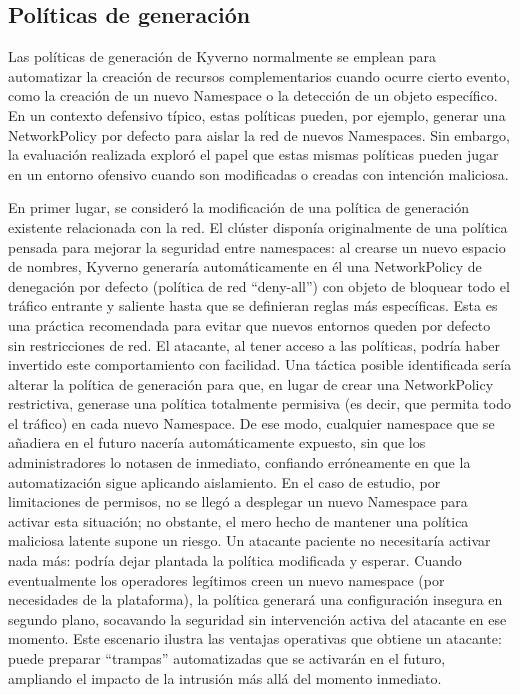\documentclass[12pt,twoside,titlepage]{report}
\begin{document}
\subsection{Políticas de generación}
Las políticas de generación de Kyverno normalmente se emplean para automatizar la creación de recursos complementarios cuando ocurre cierto evento, como la creación de un nuevo Namespace o la detección de un objeto específico. En un contexto defensivo típico, estas políticas pueden, por ejemplo, generar una NetworkPolicy por defecto para aislar la red de nuevos Namespaces. Sin embargo, la evaluación realizada exploró el papel que estas mismas políticas pueden jugar en un entorno ofensivo cuando son modificadas o creadas con intención maliciosa. 

En primer lugar, se consideró la modificación de una política de generación existente relacionada con la red. El clúster disponía originalmente de una política pensada para mejorar la seguridad entre namespaces: al crearse un nuevo espacio de nombres, Kyverno generaría automáticamente en él una NetworkPolicy de denegación por defecto (política de red “deny-all”) con objeto de bloquear todo el tráfico entrante y saliente hasta que se definieran reglas más específicas. Esta es una práctica recomendada para evitar que nuevos entornos queden por defecto sin restricciones de red. El atacante, al tener acceso a las políticas, podría haber invertido este comportamiento con facilidad. Una táctica posible identificada sería alterar la política de generación para que, en lugar de crear una NetworkPolicy restrictiva, generase una política totalmente permisiva (es decir, que permita todo el tráfico) en cada nuevo Namespace. De ese modo, cualquier namespace que se añadiera en el futuro nacería automáticamente expuesto, sin que los administradores lo notasen de inmediato, confiando erróneamente en que la automatización sigue aplicando aislamiento. En el caso de estudio, por limitaciones de permisos, no se llegó a desplegar un nuevo Namespace para activar esta situación; no obstante, el mero hecho de mantener una política maliciosa latente supone un riesgo. Un atacante paciente no necesitaría activar nada más: podría dejar plantada la política modificada y esperar. Cuando eventualmente los operadores legítimos creen un nuevo namespace (por necesidades de la plataforma), la política generará una configuración insegura en segundo plano, socavando la seguridad sin intervención activa del atacante en ese momento. Este escenario ilustra las ventajas operativas que obtiene un atacante: puede preparar “trampas” automatizadas que se activarán en el futuro, ampliando el impacto de la intrusión más allá del momento inmediato. 
\end{document}
